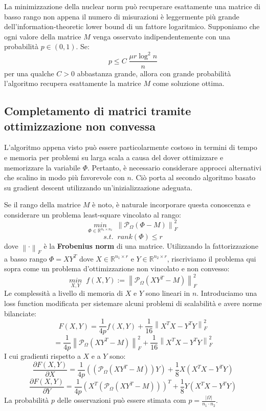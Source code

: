 \documentclass[12pt,a4paper]{report}
\newcommand{\frobnorm}[1]{\left\lVert#1\right\rVert _F}
\begin{document}
La minimizzazione della nuclear norm può recuperare esattamente
una matrice di basso rango non appena il numero di misurazioni è leggermente più grande
dell'information-theoretic lower bound di un fattore logaritmico.
Supponiamo che ogni valore della matrice $M$ venga osservato indipendentemente
con una probabilità $p \in (0,1)$. Se:
$$ p \leq C \; \frac{\mu r \log^2 n}{n} $$
per una qualche $C>0$ abbastanza grande, allora con grande probabilità
l'algoritmo recupera esattamente 
la matrice $M$ come soluzione ottima.

\subsection{Completamento di matrici tramite ottimizzazione non convessa}

L'algoritmo appena visto può essere particolarmente costoso in termini di tempo e memoria
per problemi su larga scala a causa del dover ottimizzare e memorizzare la variabile $\Phi$.
Pertanto, è necessario considerare approcci alternativi che scalino in modo più favorevole con $n$.
Ciò porta al secondo algoritmo basato su gradient descent utilizzando un'inizializzazione adeguata.

Se il rango della matrice $M$ è noto, è naturale incorporare questa conoscenza 
e considerare un problema least-square vincolato al rango:
$$ \underset{\Phi \in \mathbb{R}^{n_1 \times n_2}}{min}\;\; \frobnorm{\mathcal{P}_{\Omega}(\Phi - M)}^2 $$
$$ s.t. \;\;  rank(\Phi) \leq r $$ 
dove $\frobnorm{\cdot}$ è la \textbf{Frobenius norm} di una matrice.
Utilizzando la fattorizzazione a basso rango $\Phi = XY^T$ dove $X \in \mathbb{R}^{n_1 \times r}$
e $Y \in \mathbb{R}^{n_2 \times r}$, riscriviamo il problema qui sopra come 
un problema d'ottimizzazione non vincolato e non convesso:
$$ \underset{X,Y}{min}\;\; \mathit{f}(X,Y) := \frobnorm{\mathcal{P}_{\Omega}(XY^T - M)}^2 $$
Le complessità a livello di memoria di $X$ e $Y$ sono lineari in $n$.
Introduciamo una loss function modificata per sistemare alcuni
problemi di scalabilità e avere norme bilanciate:
$$ F(X,Y) = \frac{1}{4p}\mathit{f}(X,Y) + \frac{1}{16}\frobnorm{X^TX - Y^TY}^2  $$
$$ = \frac{1}{4p}\frobnorm{\mathcal{P}_{\Omega}(XY^T - M)}^2 + \frac{1}{16}\frobnorm{X^TX - Y^TY}^2 $$
I cui gradienti rispetto a $X$ e a $Y$ sono:
$$ \frac{\partial F(X,Y)}{\partial X} = \frac{1}{4p} ((\mathcal{P}_{\Omega}(XY^T - M))Y) + \frac{1}{8} X (X^TX-Y^TY)$$
$$ \frac{\partial F(X,Y)}{\partial Y} = \frac{1}{4p} (X^T(\mathcal{P}_{\Omega}(XY^T - M)))^T + \frac{1}{8} Y (X^TX-Y^TY)$$
\newpage
La probabilità $p$ delle osservazioni può essere stimata com $p = \frac{|\Omega|}{n_1\cdot n_2}$.
\end{document}
